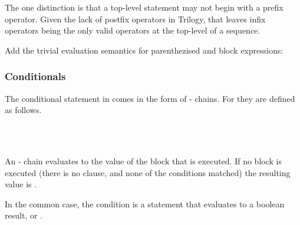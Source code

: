 The one distinction is that a top-level statement may not begin with a
prefix operator. Given the lack of postfix operators in Trilogy, that
leaves infix operators being the only valid operators at the top-level
of a sequence.

Add the trivial evaluation semantics for parenthezised and block
expressions:

\begin{figure}[H]
    \centering
    \parbox[t]{0.35\linewidth}{
        \begin{prooftree}
        \end{prooftree}
    }
    \parbox[t]{0.35\linewidth}{
        \begin{prooftree}
        \end{prooftree}
    }
\end{figure}

\subsubsection{Conditionals}

The conditional statement in \Trilogy{} comes in the form of -
chains. For \Prose{} they are defined as follows.

\begin{bnf*}
     \\
     \\
\end{bnf*}

An - chain evaluates to the value of the block that is executed.
If no block is executed (there is no  clause, and none of the
conditions matched) the resulting value is .

In the common case, the condition is a statement that evaluates to a boolean
result,  or .

